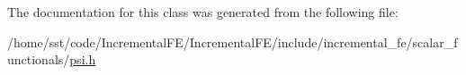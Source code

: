 The documentation for this class was generated from the following file\+:\begin{DoxyCompactItemize}
\item 
/home/sst/code/\+Incremental\+F\+E/\+Incremental\+F\+E/include/incremental\+\_\+fe/scalar\+\_\+functionals/\hyperlink{psi_8h}{psi.\+h}\end{DoxyCompactItemize}

